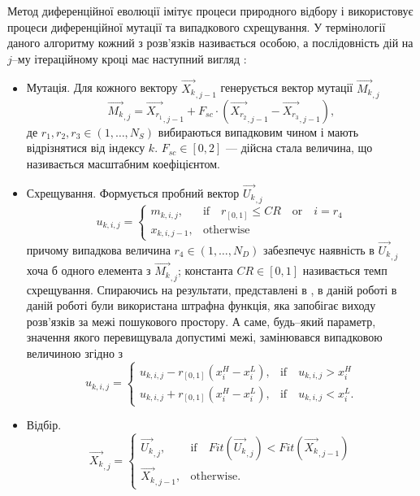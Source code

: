 Метод диференційної еволюції імітує процеси природного відбору і використовує процеси диференційної мутації та випадкового схрещування.
У термінології даного алгоритму кожний з розв'язків називається особою, а послідовність дій на $j$--му ітераційному кроці має наступний вигляд \cite{DEWang,DEModif}:
\begin{itemize}[leftmargin=0cm,itemindent=1em]
  \item Мутація. Для кожного вектору $\overrightarrow{X_{k}}_{,j-1}$ генерується вектор мутації $\overrightarrow{M_{k}}_{,j}$
  \begin{equation}
 \label{eqDEMut}
 \overrightarrow{M_{k}}_{,j}=\overrightarrow{X_{r_1}}_{,j-1}+F_{sc}\cdot\left(\overrightarrow{X_{r_2}}_{,j-1}-\overrightarrow{X_{r_3}}_{,j-1}\right),
 \end{equation}
 де $r_1,r_2,r_3\in(1,\ldots,N_S)$ вибираються випадковим чином і мають відрізнятися від індексу $k$.
 $F_{sc}\in[0,2]$  --- дійсна стала величина, що називається масштабним коефіцієнтом.


  \item Схрещування. Формується пробний вектор $\overrightarrow{U_{k}}_{,j}$
  \begin{equation}
 \label{eqDECros}
 u_{k,i,j}=\left\{
 \begin{array}{ll}
 m_{k,i,j},& \text{if} \quad r_{[0,1]}\leq C\!R \quad \text{or} \quad i=r_{4}\\
 x_{k,i,j-1},& \text{otherwise}
 \end{array}
 \right.
 \end{equation}
 причому випадкова величина $r_4\in(1,\ldots,N_D)$
забезпечує наявність в $\overrightarrow{U_{k}}_{,j}$ хоча б одного елемента з $\overrightarrow{M_{k}}_{,j}$;
 константа $C\!R\in[0,1]$ називається темп схрещування.
  Спираючись на результати, представлені в \cite{P-DE_Ishaque},
  в даній роботі в даній роботі були використана штрафна функція, яка запобігає виходу розв'язків за межі пошукового простору.
  А саме, будь--який параметр, значення якого перевищувала допустимі межі, замінювався випадковою величиною згідно з
    \begin{equation}
 \label{eqDEPen}
 u_{k,i,j}=\left\{
 \begin{array}{ll}
 u_{k,i,j}-r_{[0,1]}(x_i^H-x_i^L),& \text{if} \quad u_{k,i,j}>x_i^H\\
 u_{k,i,j}+r_{[0,1]}(x_i^H-x_i^L),& \text{if} \quad u_{k,i,j}<x_i^L.
 \end{array}
 \right.
 \end{equation}
  \item Відбір.
      \begin{equation}
 \label{eqDESel}
 \overrightarrow{X_{k}}_{,j}=\left\{
 \begin{array}{ll}
\overrightarrow{U_{k}}_{,j},& \text{if} \quad Fit(\overrightarrow{U_k}_{,j})<Fit(\overrightarrow{X_k}_{,j-1})\\
 \overrightarrow{X_{k}}_{,j-1},& \text{otherwise}.
 \end{array}
 \right.
 \end{equation}

\end{itemize}
